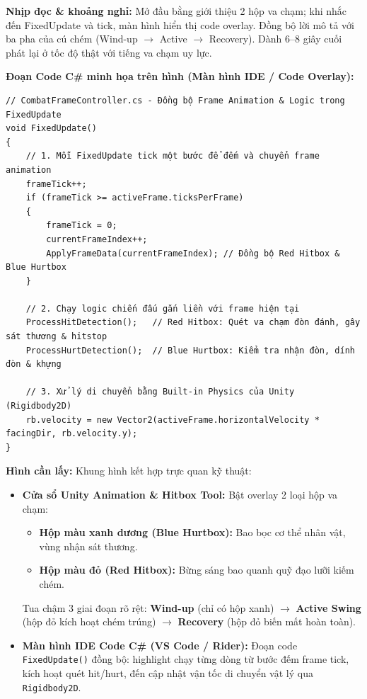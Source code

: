 \documentclass[11pt,a4paper]{article}
\newcommand{\field}[2]{\textbf{\color{divergencynavy}#1:} #2\par\vspace{2pt}}
\begin{document}
\field{Nhịp đọc \& khoảng nghỉ}{Mở đầu bằng giới thiệu 2 hộp va chạm; khi nhắc đến FixedUpdate và tick, màn hình hiển thị code overlay. Đồng bộ lời mô tả với ba pha của cú chém (Wind-up $\rightarrow$ Active $\rightarrow$ Recovery). Dành 6--8 giây cuối phát lại ở tốc độ thật với tiếng va chạm uy lực.}

\textbf{\color{divergencynavy}Đoạn Code C\# minh họa trên hình (Màn hình IDE / Code Overlay):}\par\vspace{2pt}
\begin{lstlisting}[style=unitycsharp, language={[Sharp]C}]
// CombatFrameController.cs - Đồng bộ Frame Animation & Logic trong FixedUpdate
void FixedUpdate()
{
    // 1. Mỗi FixedUpdate tick một bước để đếm và chuyển frame animation
    frameTick++;
    if (frameTick >= activeFrame.ticksPerFrame)
    {
        frameTick = 0;
        currentFrameIndex++;
        ApplyFrameData(currentFrameIndex); // Đồng bộ Red Hitbox & Blue Hurtbox
    }

    // 2. Chạy logic chiến đấu gắn liền với frame hiện tại
    ProcessHitDetection();   // Red Hitbox: Quét va chạm đòn đánh, gây sát thương & hitstop
    ProcessHurtDetection();  // Blue Hurtbox: Kiểm tra nhận đòn, dính đòn & khựng

    // 3. Xử lý di chuyển bằng Built-in Physics của Unity (Rigidbody2D)
    rb.velocity = new Vector2(activeFrame.horizontalVelocity * facingDir, rb.velocity.y);
}
\end{lstlisting}\par\vspace{4pt}

\field{Hình cần lấy}{Khung hình kết hợp trực quan kỹ thuật:
\begin{itemize}
    \item \textbf{Cửa sổ Unity Animation \& Hitbox Tool:} Bật overlay 2 loại hộp va chạm:
    \begin{itemize}
        \item \textbf{Hộp màu xanh dương (Blue Hurtbox):} Bao bọc cơ thể nhân vật, vùng nhận sát thương.
        \item \textbf{Hộp màu đỏ (Red Hitbox):} Bừng sáng bao quanh quỹ đạo lưỡi kiếm chém.
    \end{itemize}
    Tua chậm 3 giai đoạn rõ rệt: \textbf{Wind-up} (chỉ có hộp xanh) $\rightarrow$ \textbf{Active Swing} (hộp đỏ kích hoạt chém trúng) $\rightarrow$ \textbf{Recovery} (hộp đỏ biến mất hoàn toàn).
    \item \textbf{Màn hình IDE Code C\# (VS Code / Rider):} Đoạn code \texttt{FixedUpdate()} đồng bộ: highlight chạy từng dòng từ bước đếm frame tick, kích hoạt quét hit/hurt, đến cập nhật vận tốc di chuyển vật lý qua \texttt{Rigidbody2D}.
\end{itemize}}
\end{document}

